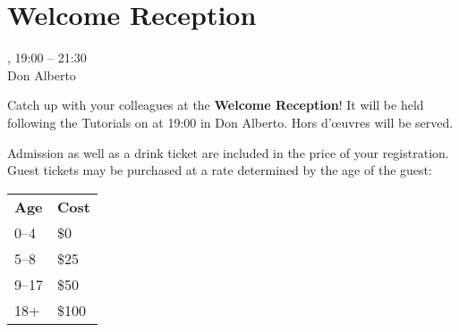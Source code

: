 \clearpage
\section[Welcome Reception]{Welcome Reception}
\setheaders{}{\daydateyear}

\begin{center}
\daydateyear, 19:00 -- 21:30 \vspace{1em}\\
Don Alberto\\
\end{center}

\noindent Catch up with your colleagues at the \textbf{Welcome
Reception}! It will be held following the Tutorials
on \daydate at 19:00 in Don Alberto. Hors d'\oe{}uvres will be served.

Admission as well as a drink ticket are included in the price of your
registration. Guest tickets may be purchased at a rate determined by the age of the guest:

\begin{tabular}{ll}
{\bf Age} & {\bf Cost} \\
    0--4 & \$0 \\
    5--8 & \$25 \\
    9--17 & \$50 \\
    18+ & \$100 \\
\end{tabular}